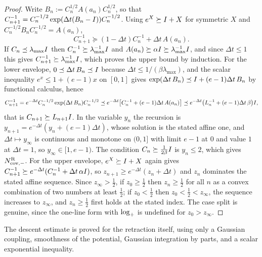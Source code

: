 \begin{proof}
    Write $B_n:=C_n^{1/2}A(a_n)C_n^{1/2}$, so that
    $C_{n+1}^{-1}=C_n^{-1/2}\exp(\Delta t(B_n-I))C_n^{-1/2}$. Using $e^X\succeq I+X$ for
    symmetric $X$ and $C_n^{-1/2}B_nC_n^{-1/2}=A(a_n)$,
    \begin{equation*}
        C_{n+1}^{-1}\succeq(1-\Delta t)C_n^{-1}+\Delta t\,A(a_n).
    \end{equation*}
    If $C_n\preceq\lambda_{\max}I$ then $C_n^{-1}\succeq\lambda_{\max}^{-1}I$ and
    $A(a_n)\succeq\alpha I\succeq\lambda_{\max}^{-1}I$, and since $\Delta t\leq1$ this gives
    $C_{n+1}^{-1}\succeq\lambda_{\max}^{-1}I$, which proves the upper bound by induction.
    For the lower envelope, $0\preceq\Delta t\,B_n\preceq I$ because
    $\Delta t\leq1/(\beta\lambda_{\max})$, and the scalar inequality $e^x\leq1+(e-1)x$ on
    $[0,1]$ gives $\exp(\Delta t\,B_n)\preceq I+(e-1)\Delta t\,B_n$ by functional calculus,
    hence
    \begin{equation*}
        C_{n+1}^{-1}
        =e^{-\Delta t}C_n^{-1/2}\exp(\Delta t\,B_n)C_n^{-1/2}
        \preceq e^{-\Delta t}\bigl[C_n^{-1}+(e-1)\Delta t\,A(a_n)\bigr]
        \preceq e^{-\Delta t}\bigl(L_n^{-1}+(e-1)\Delta t\,\beta\bigr)I,
    \end{equation*}
    that is $C_{n+1}\succeq L_{n+1}I$. In the variable $y_n$ the recursion is
    $y_{n+1}=e^{-\Delta t}(y_n+(e-1)\Delta t)$, whose solution is the stated affine one, and
    $\Delta t\mapsto y_\infty$ is continuous and monotone on $(0,1]$ with limit $e-1$ at
    $0$ and value $1$ at $\Delta t=1$, so $y_\infty\in[1,e-1)$. The condition
    $C_n\succeq\tfrac1{2\beta}I$ is $y_n\leq2$, which gives $N_{\mathrm{cov},-}^{\mathrm{R}}$. For the
    upper envelope, $e^X\succeq I+X$ again gives
    $C_{n+1}^{-1}\succeq e^{-\Delta t}(C_n^{-1}+\Delta t\,\alpha I)$, so
    $z_{n+1}\geq e^{-\Delta t}(z_n+\Delta t)$ and $z_n$ dominates the stated affine sequence.
    Since $z_\infty>\tfrac12$, if $z_0\geq\tfrac12$ then $z_n\geq\tfrac12$ for all $n$ as a
    convex combination of two numbers at least $\tfrac12$; if $z_0<\tfrac12$ then
    $z_0<\tfrac12<z_\infty$, the sequence increases to $z_\infty$, and $z_n\geq\tfrac12$
    first holds at the stated index. The case split is genuine, since the one-line form with
    $\log_+$ is undefined for $z_0>z_\infty$.
\end{proof}

The descent estimate is proved for the retraction itself, using only a Gaussian coupling,
smoothness of the potential, Gaussian integration by parts, and a scalar exponential
inequality.

